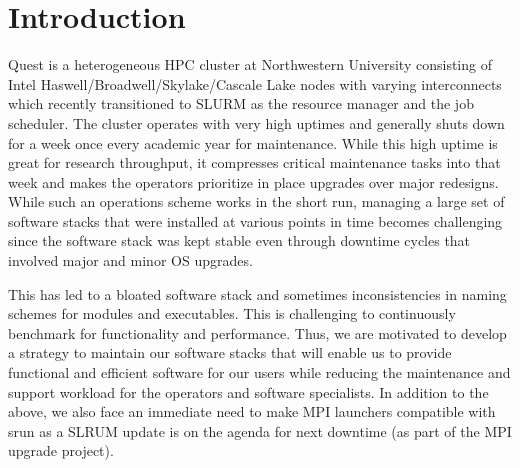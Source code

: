 \documentclass[sigconf,authordraft]{acmart}
\begin{document}


\maketitle

\section{Introduction}

Quest is a heterogeneous HPC cluster\cite{quest} at Northwestern University consisting of Intel Haswell/Broadwell/Skylake/Cascale Lake nodes with varying interconnects which recently transitioned to SLURM\cite{slurm} as the resource manager and the job scheduler. The cluster operates with very high uptimes and generally shuts down for a week once every academic year for maintenance. While this high uptime is great for research throughput, it compresses critical maintenance tasks into that week and makes the operators prioritize in place upgrades over major redesigns. While such an operations scheme works in the short run, managing a large set of software stacks that were installed at various points in time becomes challenging since the software stack was kept stable even through downtime cycles that involved major and minor OS upgrades.

This has led to a bloated software stack and sometimes inconsistencies in naming schemes for modules and executables. This is challenging to continuously benchmark for functionality and performance. Thus, we are motivated to develop a strategy to maintain our software stacks that will enable us to provide functional and efficient software for our users while reducing the maintenance and support workload for the operators and software specialists. In addition to the above, we also face an immediate need to make MPI launchers compatible with srun as a SLRUM update is on the agenda for next downtime (as part of the MPI upgrade project).
\end{document}
